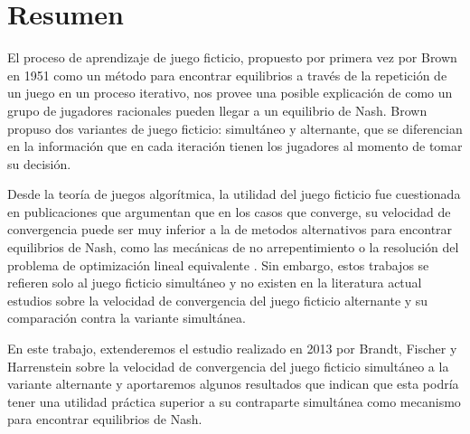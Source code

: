 \chapter*{Resumen}


El proceso de aprendizaje de juego ficticio, propuesto por primera vez por Brown en 1951 \cite{brown:1951} como un método para encontrar equilibrios a través de la repetición de un juego en un proceso iterativo, nos provee una posible explicación de como un grupo de jugadores racionales pueden llegar a un equilibrio de Nash. Brown propuso dos variantes de juego ficticio: simultáneo y alternante, que se diferencian en la información que en cada iteración tienen los jugadores al momento de tomar su decisión.

Desde la teoría de juegos algorítmica, la utilidad del juego ficticio fue cuestionada en publicaciones que argumentan que en los casos que converge, su velocidad de convergencia puede ser muy inferior a la de metodos alternativos para encontrar equilibrios de Nash, como las mecánicas de no arrepentimiento o la resolución del problema de optimización lineal equivalente \cite{modified:fp:linear}. Sin embargo, estos trabajos se refieren solo al juego ficticio simultáneo y no existen en la literatura actual estudios sobre la velocidad de convergencia del juego ficticio alternante y su comparación contra la variante simultánea.

En este trabajo, extenderemos el estudio realizado en 2013 por Brandt, Fischer y Harrenstein \cite{brandt:rate:convergence} sobre la velocidad de convergencia del juego ficticio simultáneo a la variante alternante y aportaremos algunos resultados que indican que esta podría tener una utilidad práctica superior a su contraparte simultánea como mecanismo para encontrar equilibrios de Nash.